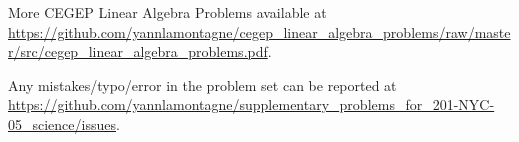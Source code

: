 More CEGEP Linear Algebra Problems available at \url{https://github.com/yannlamontagne/cegep_linear_algebra_problems/raw/master/src/cegep_linear_algebra_problems.pdf}.

Any mistakes/typo/error in the problem set can be reported at \url{https://github.com/yannlamontagne/supplementary_problems_for_201-NYC-05_science/issues}.
